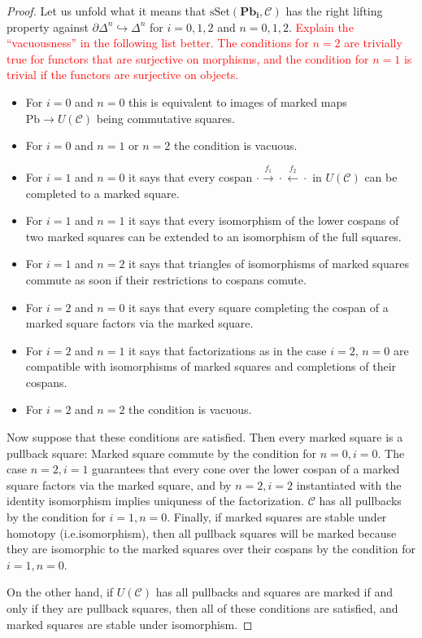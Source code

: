 \documentclass{article}
\newcommand{\todo}[1]{\textcolor{red}{#1}}
\theoremstyle{remark}
\theoremstyle{definition}
\begin{document}
\begin{proof}
  Let us unfold what it means that $\mathrm{sSet}(\mathbf{Pb_i}, \mathcal{C})$ has the right lifting property against $\partial \Delta^n \hookrightarrow \Delta^n$ for $i = 0, 1, 2$ and $n = 0, 1, 2$.
  \todo{
    Explain the ``vacuousness'' in the following list better.
    The conditions for $n = 2$ are trivially true for functors that are surjective on morphisms, and the condition for $n = 1$ is trivial if the functors are surjective on objects.
  }
  \begin{itemize}
    \item
      For $i = 0$ and $n = 0$ this is equivalent to images of marked maps $\mathrm{Pb} \rightarrow U(\mathcal{C})$ being commutative squares.
    \item
      For $i = 0$ and $n = 1$ or $n = 2$ the condition is vacuous.
    \item
      For $i = 1$ and $n = 0$ it says that every cospan $\cdot \xrightarrow{f_1} \cdot \xleftarrow{f_2} \cdot$ in $U(\mathcal{C})$ can be completed to a marked square.
    \item
      For $i = 1$ and $n = 1$ it says that every isomorphism of the lower cospans of two marked squares can be extended to an isomorphism of the full squares.
    \item
      For $i = 1$ and $n = 2$ it says that triangles of isomorphisms of marked squares commute as soon if their restrictions to cospans comute.
    \item
      For $i = 2$ and $n = 0$ it says that every square completing the cospan of a marked square factors via the marked square.
    \item
      For $i = 2$ and $n = 1$ it says that factorizations as in the case $i = 2$, $n = 0$ are compatible with isomorphisms of marked squares and completions of their cospans.
    \item
      For $i = 2$ and $n = 2$ the condition is vacuous.
  \end{itemize}
  Now suppose that these conditions are satisfied.
  Then every marked square is a pullback square:
  Marked square commute by the condition for $n = 0, i = 0$.
  The case $n = 2, i = 1$ guarantees that every cone over the lower cospan of a marked square factors via the marked square, and by $n = 2, i = 2$ instantiated with the identity isomorphism implies uniquness of the factorization.
  $\mathcal{C}$ has all pullbacks by the condition for $i = 1, n = 0$.
  Finally, if marked squares are stable under homotopy (i.e.\@ isomorphism), then all pullback squares will be marked because they are isomorphic to the marked squares over their cospans by the condition for $i = 1, n = 0$.

  On the other hand, if $U(\mathcal{C})$ has all pullbacks and squares are marked if and only if they are pullback squares, then all of these conditions are satisfied, and marked squares are stable under isomorphism.
\end{proof}
\end{document}
